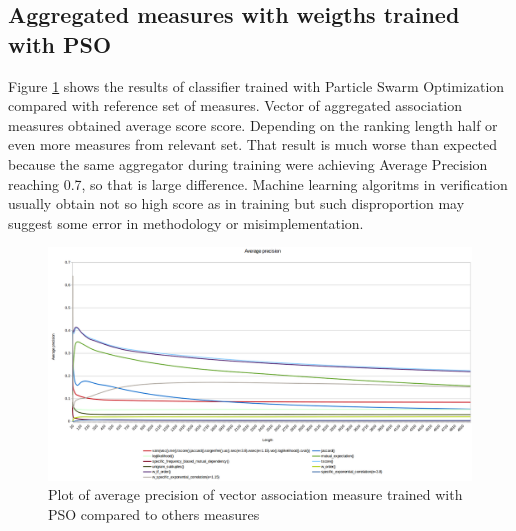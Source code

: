 \subsection{Aggregated measures with weigths trained with PSO}
Figure \ref{pso_verif} shows the results of classifier trained with Particle Swarm Optimization compared with reference set of measures. 
Vector of aggregated association measures obtained average score score. Depending on the ranking length half or even more measures from 
relevant set. That result is much worse than expected because the same aggregator during training were achieving Average Precision 
reaching 0.7, so that is large difference. Machine learning algoritms in verification usually obtain not so high score as in training but 
such disproportion may suggest some error in methodology or misimplementation.

\begin{figure}[ht]
    \centering
    \includegraphics[scale=0.32]{img/pso_verif.png}
    \caption{Plot of average precision of vector association measure trained with PSO compared to others measures}
    \label{pso_verif}
\end{figure}